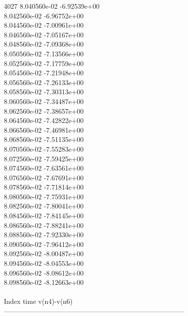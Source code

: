 4027	8.040560e-02	-6.92539e+00	\\ 	8.042560e-02	-6.96752e+00	\\ 	8.044560e-02	-7.00961e+00	\\ 	8.046560e-02	-7.05167e+00	\\ 	8.048560e-02	-7.09368e+00	\\ 	8.050560e-02	-7.13566e+00	\\ 	8.052560e-02	-7.17759e+00	\\ 	8.054560e-02	-7.21948e+00	\\ 	8.056560e-02	-7.26133e+00	\\ 	8.058560e-02	-7.30313e+00	\\ 	8.060560e-02	-7.34487e+00	\\ 	8.062560e-02	-7.38657e+00	\\ 	8.064560e-02	-7.42822e+00	\\ 	8.066560e-02	-7.46981e+00	\\ 	8.068560e-02	-7.51135e+00	\\ 	8.070560e-02	-7.55283e+00	\\ 	8.072560e-02	-7.59425e+00	\\ 	8.074560e-02	-7.63561e+00	\\ 	8.076560e-02	-7.67691e+00	\\ 	8.078560e-02	-7.71814e+00	\\ 	8.080560e-02	-7.75931e+00	\\ 	8.082560e-02	-7.80041e+00	\\ 	8.084560e-02	-7.84145e+00	\\ 	8.086560e-02	-7.88241e+00	\\ 	8.088560e-02	-7.92330e+00	\\ 	8.090560e-02	-7.96412e+00	\\ 	8.092560e-02	-8.00487e+00	\\ 	8.094560e-02	-8.04553e+00	\\ 	8.096560e-02	-8.08612e+00	\\ 	8.098560e-02	-8.12663e+00	\\ \hline
\\ \hline
Index   time            v(n4)-v(n6)     \\ \hline
--------------------------------------------------------------------------------\\ \hline

